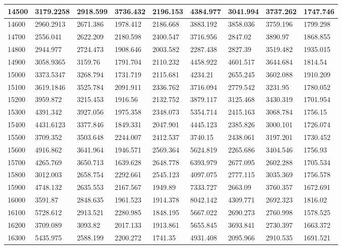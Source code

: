 \documentclass [11pt, proquest] {uwthesis}[2020/12/20]
\begin{document}
\begin{table}[]
\begin{tiny}
\begin{tabular}{|l|l|l|l|l|l|l|l|l|}
14500 & 3179.2258 & 2918.599 & 3736.432 & 2196.153 & 4384.977 & 3041.994 & 3737.262 & 1747.746 \\ \hline
14600 & 2960.2913 & 2671.386 & 1978.412 & 2186.668 & 3883.192 & 3858.036 & 3759.196 & 1799.298 \\ \hline
14700 & 2556.041 & 2622.209 & 2180.598 & 2400.547 & 3716.956 & 2847.02 & 3890.97 & 1868.855 \\ \hline
14800 & 2944.977 & 2724.473 & 1908.646 & 2003.582 & 2287.438 & 2827.39 & 3519.482 & 1935.015 \\ \hline
14900 & 3058.9365 & 3159.76 & 1791.704 & 2110.232 & 4458.922 & 4601.517 & 3644.684 & 1814.54 \\ \hline
15000 & 3373.5347 & 3268.794 & 1731.719 & 2115.681 & 4234.21 & 2655.245 & 3602.088 & 1910.209 \\ \hline
15100 & 3619.1846 & 3525.784 & 2091.911 & 2336.762 & 3716.094 & 2779.542 & 3231.95 & 1780.052 \\ \hline
15200 & 3959.872 & 3215.453 & 1916.56 & 2132.752 & 3879.117 & 3125.468 & 3430.319 & 1701.954 \\ \hline
15300 & 4391.342 & 3927.056 & 1975.358 & 2348.073 & 5354.714 & 2415.163 & 3068.784 & 1756.15 \\ \hline
15400 & 4431.6123 & 3377.846 & 1849.331 & 2047.901 & 4445.123 & 2385.826 & 3000.101 & 1726.074 \\ \hline
15500 & 3709.352 & 3503.648 & 2244.007 & 2412.537 & 3740.15 & 2438.061 & 3197.201 & 1730.452 \\ \hline
15600 & 4916.862 & 3641.964 & 1946.571 & 2569.364 & 5624.819 & 2265.686 & 3404.546 & 1756.93 \\ \hline
15700 & 4265.769 & 3650.713 & 1639.628 & 2648.778 & 6393.979 & 2677.095 & 2602.288 & 1705.534 \\ \hline
15800 & 3012.003 & 2658.754 & 2292.661 & 2545.123 & 4097.075 & 2777.115 & 3035.369 & 1756.578 \\ \hline
15900 & 4748.132 & 2635.553 & 2167.567 & 1949.89 & 7333.727 & 2663.09 & 3760.357 & 1672.691 \\ \hline
16000 & 3591.87 & 2848.635 & 1961.523 & 1914.378 & 8042.142 & 4309.771 & 2692.323 & 1816.02 \\ \hline
16100 & 5728.612 & 2913.521 & 2280.985 & 1848.195 & 5667.022 & 2690.273 & 2760.998 & 1578.525 \\ \hline
16200 & 3709.089 & 3093.82 & 2017.133 & 1913.861 & 5655.845 & 3693.841 & 2730.397 & 1663.372 \\ \hline
16300 & 5435.975 & 2588.199 & 2200.272 & 1741.35 & 4931.408 & 2095.966 & 2910.535 & 1691.521 \\ \hline

\end{tabular}
\end{tiny}
\end{table}
\end{document}
